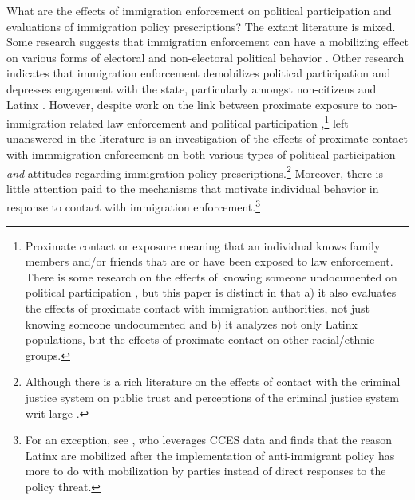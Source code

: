 \documentclass[10pt,]{article}
\begin{document}
What are the effects of immigration enforcement on political
participation and evaluations of immigration policy prescriptions? The
extant literature is mixed. Some research suggests that immigration
enforcement can have a mobilizing effect on various forms of electoral
and non-electoral political behavior
\citep{corneliusdeath2001, pantojacitizens2001, whitewhen2016, zepeda-millanlatino2017}.
Other research indicates that immigration enforcement demobilizes
political participation and depresses engagement with the state,
particularly amongst non-citizens and Latinx
\citep{watsoninside2014, pedrazaimmigration2015, vargasimmigration2015, vargasmixed-status2016, potochnicklocal-level2017, amuedo-dorantesinterior2017}.
However, despite work on the link between proximate exposure to
non-immigration related law enforcement and political participation
\citep{leeconsequences2014, walkerextending2014, walkerfor2017, walkertargeted:nodate},\footnote{Proximate
  contact or exposure meaning that an individual knows family members
  and/or friends that are or have been exposed to law enforcement. There
  is some research on the effects of knowing someone undocumented on
  political participation \citep{streetpolitical2017}, but this paper is
  distinct in that a) it also evaluates the effects of proximate contact
  with immigration authorities, not just knowing someone undocumented
  and b) it analyzes not only Latinx populations, but the effects of
  proximate contact on other racial/ethnic groups.} left unanswered in
the literature is an investigation of the effects of proximate contact
with immmigration enforcement on both various types of political
participation \emph{and} attitudes regarding immigration policy
prescriptions.\footnote{Although there is a rich literature on the
  effects of contact with the criminal justice system on public trust
  and perceptions of the criminal justice system writ large
  \citep{tylertrust2002, weitzerincidents2002, engelcitizens2005, peffleyjustice2010, lermanarresting2014}.}
Moreover, there is little attention paid to the mechanisms that motivate
individual behavior in response to contact with immigration
enforcement.\footnote{For an exception, see \citet{whitewhen2016}, who
  leverages CCES data and finds that the reason Latinx are mobilized
  after the implementation of anti-immigrant policy has more to do with
  mobilization by parties instead of direct responses to the policy
  threat.}
\end{document}
